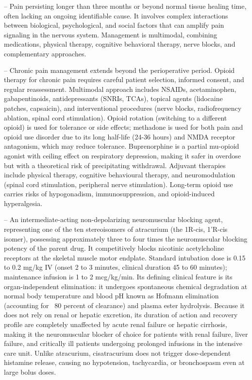 -- Pain persisting longer than three months or beyond normal tissue healing time, often lacking an ongoing identifiable cause. It involves complex interactions between biological, psychological, and social factors that can amplify pain signaling in the nervous system. Management is multimodal, combining medications, physical therapy, cognitive behavioral therapy, nerve blocks, and complementary approaches.

-- Chronic pain management extends beyond the perioperative period. Opioid therapy for chronic pain requires careful patient selection, informed consent, and regular reassessment. Multimodal approach includes NSAIDs, acetaminophen, gabapentinoids, antidepressants (SNRIs, TCAs), topical agents (lidocaine patches, capsaicin), and interventional procedures (nerve blocks, radiofrequency ablation, spinal cord stimulation). Opioid rotation (switching to a different opioid) is used for tolerance or side effects; methadone is used for both pain and opioid use disorder due to its long half-life (24-36 hours) and NMDA receptor antagonism, which may reduce tolerance. Buprenorphine is a partial mu-opioid agonist with ceiling effect on respiratory depression, making it safer in overdose but with a theoretical risk of precipitating withdrawal. Adjuvant therapies include physical therapy, cognitive behavioural therapy, and neuromodulation (spinal cord stimulation, peripheral nerve stimulation). Long-term opioid use carries risks of hypogonadism, immunosuppression, and opioid-induced hyperalgesia.

-- An intermediate-acting non-depolarizing neuromuscular blocking agent, representing one of the ten stereoisomers of atracurium (the 1R-cis, 1'R-cis isomer), possessing approximately three to four times the neuromuscular blocking potency of the parent drug. It competitively blocks nicotinic acetylcholine receptors at the skeletal muscle motor endplate. Standard intubation dose is 0.15 to 0.2 mg/kg IV (onset 2 to 3 minutes, clinical duration 45 to 60 minutes); maintenance infusion is 1 to 2 mcg/kg/min. Its defining clinical feature is its organ-independent elimination: it undergoes spontaneous chemical degradation at normal body temperature and blood pH known as Hofmann elimination (accounting for ~80 percent of clearance) and plasma ester hydrolysis. Because it does not rely on renal or hepatic excretion, its duration of action and recovery profile are completely unaffected by acute renal failure or hepatic cirrhosis, making it the neuromuscular blocker of choice for patients with renal failure, liver failure, and critically ill patients undergoing prolonged infusions in the intensive care unit. Unlike atracurium, cisatracurium does not trigger dose-dependent histamine release, causing no hypotension, tachycardia, or bronchospasm even at large bolus doses.


